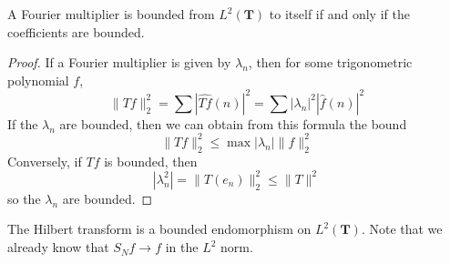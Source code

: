 \begin{theorem}
    A Fourier multiplier is bounded from $L^2(\mathbf{T})$ to itself if and only if the coefficients are bounded.
\end{theorem}
\begin{proof}
    If a Fourier multiplier is given by $\lambda_n$, then for some trigonometric polynomial $f$,
    \[ \| Tf \|_2^2 = \sum \left|\widehat{Tf}(n) \right|^2 = \sum |\lambda_n|^2 \left| \widehat{f}(n) \right|^2 \]
    If the $\lambda_n$ are bounded, then we can obtain from this formula the bound
    \[ \| Tf \|_2^2 \leq \max |\lambda_n| \| f \|_2^2 \]
    Conversely, if $Tf$ is bounded, then
    \[ |\lambda_n^2| = \| T(e_n) \|_2^2 \leq \| T \|^2 \]
    so the $\lambda_n$ are bounded.
\end{proof}

\begin{corollary}
    The Hilbert transform is a bounded endomorphism on $L^2(\mathbf{T})$. Note that we already know that $S_N f \to f$ in the $L^2$ norm.
\end{corollary}

